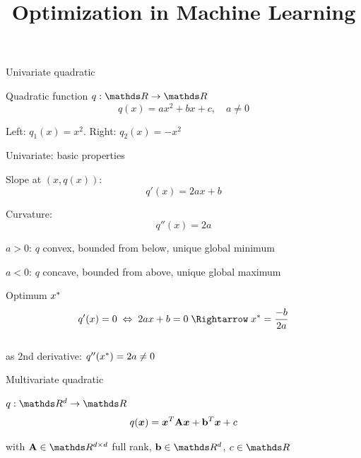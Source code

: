 \documentclass[11pt,compress,t,notes=noshow, xcolor=table]{beamer}
\title{Optimization in Machine Learning}
\begin{document}


\begin{framei}{Univariate quadratic}
\item Quadratic function $q: \R \to \R$
$$ q(x) = a x^2 + b x + c,\quad a \ne 0 $$
\item Left: $q_1(x) = x^2$. Right: $q_2(x) = - x^2$
\end{framei}


\begin{framei}{Univariate: basic properties}
\item Slope at $(x, q(x))$: $$ q'(x) = 2 a x + b $$
\item Curvature: $$ q''(x) = 2 a $$
\item $a > 0$: $q$ convex, bounded from below, unique global minimum
\item $a < 0$: $q$ concave, bounded from above, unique global maximum
\item Optimum $x^\ast$
$$ q'(x) = 0 \;\Leftrightarrow\; 2 a x + b = 0 \;\Rightarrow\; \xs = \frac{-b}{2 a} $$\\
as 2nd derivative: $q''(x^\ast) = 2 a \ne 0$
\end{framei}


\begin{framei}{Multivariate quadratic}
\item $q: \R^d \to \R$
$$ q(\bm{x}) = \bm{x}^T \mathbf{A} \bm{x} + \mathbf{b}^T \bm{x} + c $$
\item with $\A \in \R^{d \times d}$ full rank, $\bv \in \R^d$, $c \in \R$
\vfill
{}
\end{framei}
\end{document}
